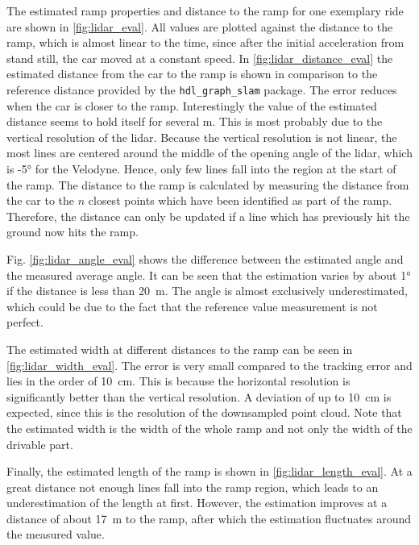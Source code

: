\renewcommand{\arraystretch}{1.2}
The estimated ramp properties and distance to the ramp for one exemplary ride are shown in \cref{fig:lidar_eval}.
All values are plotted against the distance to the ramp, which is almost linear to the time, since after the initial acceleration from stand still, the car moved at a constant speed.
In \cref{fig:lidar_distance_eval} the estimated distance from the car to the ramp is shown in comparison to the reference distance provided by the \texttt{hdl\_graph\_slam} package.
The error reduces when the car is closer to the ramp.
Interestingly the value of the estimated distance seems to hold itself for several \si{\metre}.
This is most probably due to the vertical resolution of the \gls{lidar}.
Because the vertical resolution is not linear, the most lines are centered around the middle of the opening angle of the \gls{lidar}, which is -\ang{5} for the Velodyne.
Hence, only few lines fall into the region at the start of the ramp.
The distance to the ramp is calculated by measuring the distance from the car to the $n$ closest points which have been identified as part of the ramp.
Therefore, the distance can only be updated if a line which has previously hit the ground now hits the ramp.\par
Fig. \ref{fig:lidar_angle_eval} shows the difference between the estimated angle and the measured average angle.
It can be seen that the estimation varies by about \ang{1} if the distance is less than \SI{20}{\metre}.
The angle is almost exclusively underestimated, which could be due to the fact that the reference value measurement is not perfect.\par
The estimated width at different distances to the ramp can be seen in \cref{fig:lidar_width_eval}.
The error is very small compared to the tracking error and lies in the order of \SI{10}{\cm}.
This is because the horizontal resolution is significantly better than the vertical resolution.
A deviation of up to \SI{10}{\cm} is expected, since this is the resolution of the downsampled point cloud.
Note that the estimated width is the width of the whole ramp and not only the width of the drivable part.\par
Finally, the estimated length of the ramp is shown in \cref{fig:lidar_length_eval}.
At a great distance not enough lines fall into the ramp region, which leads to an underestimation of the length at first.
However, the estimation improves at a distance of about \SI{17}{\metre} to the ramp, after which the estimation fluctuates around the measured value.\par
